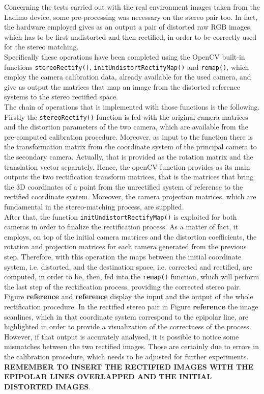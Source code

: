 Concerning the tests carried out with the real environment images taken from the Ladimo device, some pre-processing was necessary on the stereo pair too. 
In fact, the hardware employed gives as an output a pair of distorted raw RGB images, which has to be first undistorted and then rectified, in order to be correctly used for the stereo matching. \\
Specifically these operations have been completed using the OpenCV built-in functions \texttt{stereoRectify()}, \texttt{initUndistortRectifyMap()} and \texttt{remap()}, which employ the camera calibration data, already available for the used camera, and give as output the matrices that map an image from the distorted reference systems to the stereo rectified space.\\
The chain of operations that is implemented with those functions is the following.
Firstly the \texttt{stereoRectify()} function is fed with the original camera matrices and the distortion parameters of the two camera, which are available from the pre-computed calibration procedure.
Moreover, as input to the function there is the transformation matrix from the coordinate system of the principal camera to the secondary camera.
Actually, that is provided as the rotation matrix and the translation vector separately.
Hence, the openCV function provides as its main outputs the two rectification transform matrices, that is the matrices that bring the 3D coordinates of a point from the unrectified system of reference to the rectified coordinate system.
Moreover, the camera projection matrices, which are fundamental in the stereo-matching process, are supplied.\\
After that, the function \texttt{initUndistortRectifyMap()} is exploited for both cameras in order to finalize the rectification process.
As a matter of fact, it employs, on top of the initial camera matrices and the distortion coefficients, the rotation and projection matrices for each camera generated from the previous step.
Therefore, with this operation the maps between the initial coordinate system, i.e. distorted, and the destination space, i.e. corrected and rectified, are computed, in order to be, then, fed into the \texttt{remap()} function, which will perform the last step of the rectification process, providing the corrected stereo pair. \\
Figure \textbf{reference} and \textbf{reference} display the input and the output of the whole rectification procedure.
In the rectified stereo pair in Figure \textbf{reference} the image scanlines, which in that coordinate system correspond to the epipolar line, are highlighted in order to provide a visualization of the correctness of the process.
However, if that output is accurately analysed, it is possible to notice some mismatches between the two rectified images.
Those are certainly due to errors in the calibration procedure, which needs to be adjusted for further experiments.
\textbf{REMEMBER TO INSERT THE RECTIFIED IMAGES WITH THE EPIPOLAR LINES OVERLAPPED AND THE INITIAL DISTORTED IMAGES}.

